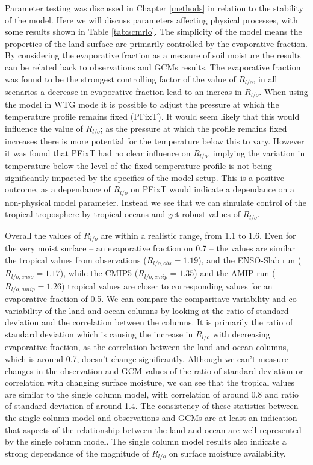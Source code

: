 Parameter testing was discussed in Chapter \ref{methods} in relation to the 
stability of the model. Here we will discuss parameters affecting physical 
processes, with some results shown in Table \ref{tab:scmrlo}. The simplicity of 
the model means the properties of the land surface are primarily controlled by 
the evaporative fraction. By considering the evaporative fraction as a measure 
of soil moisture the results can be related back to observations and GCMs 
results.  The evaporative fraction was found to be the strongest controlling 
factor of the value of $R_{l/o}$, in all scenarios a decrease in evaporative 
fraction lead to an increas in $R_{l/o}$. When using the model in WTG mode it is 
possible to adjust the pressure at which the temperature profile remains fixed 
(PFixT).  It would seem likely that this would influence the value of $R_{l/o}$; 
as the pressure at which the profile remains fixed increases there is more 
potential for the temperature below this to vary.  However it was found that 
PFixT had no clear influence on $R_{l/o}$, implying the variation in temperature 
below the level of the fixed temperature profile is not being significantly 
impacted by the specifics of the model setup. This is a positive outcome, as a 
dependance of $R_{l/o}$ on PFixT would indicate a dependance on a non-physical 
model parameter. Instead we see that we can simulate control of the tropical 
troposphere by tropical oceans and get robust values of $R_{l/o}$.

Overall the values of $R_{l/o}$ are within a realistic range, from 1.1 to 1.6.
Even for the very moist surface -- an evaporative fraction on 0.7 -- the values 
are similar the tropical values from observations ($R_{l/o, obs} =1.19$), and 
the ENSO-Slab run ($R_{l/o, enso} =1.17$), while the CMIP5 ($R_{l/o,cmip} 
=1.35$) and the AMIP run ($R_{l/o, amip} =1.26$) tropical values are closer to 
corresponding values for an evaporative fraction of 0.5. We can compare the 
comparitave variability and co-variability of the land and ocean columns by 
looking at the ratio of standard deviation and the correlation between the 
columns. It is primarily the ratio of standard deviation which is causing the 
increase in $R_{l/o}$ with decreasing evaporative fraction, as the correlation 
between the land and ocean columns, which is around 0.7, doesn't change 
significantly. Although we can't measure changes in the observation and GCM 
values of the ratio of standard deviation or correlation with changing surface 
moisture, we can see that the tropical values are similar to the single column 
model, with correlation of around 0.8 and ratio of standard deviation of around 
1.4.  The consistency of these statistics between the single column model and 
  observations and GCMs are at least an indication that aspects of the 
  relationship between the land and ocean are well represented by the single 
  column model. The single column model results also indicate a strong 
  dependance of the magnitude of $R_{l/o}$ on surface moisture availability.


